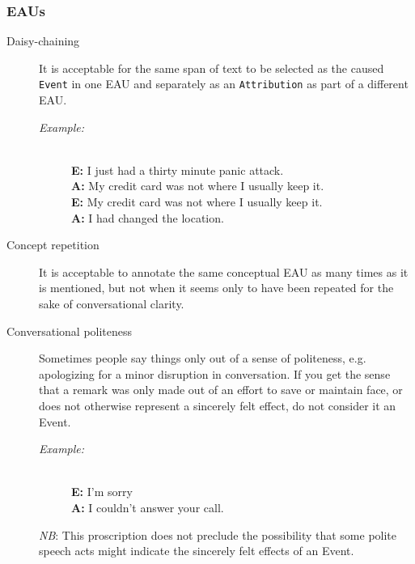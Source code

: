 \documentclass[a4paper,12pt]{article}
\begin{document}
    \subsubsection{EAUs}
    \begin{description}
        \item[Daisy-chaining] It is acceptable for the same span of text to be selected as the caused \texttt{Event} in one EAU and separately as an \texttt{Attribution} as part of a different EAU.
            \begin{description}
                \item[\emph{Example:}]\mbox{}\\
                \textbf{E:} I just had a thirty minute panic attack.\\ 
                \textbf{A:} My credit card was not where I usually keep it.\\
                \textbf{E:} My credit card was not where I usually keep it.\\
                \textbf{A:} I had changed the location.
            \end{description}
    \end{description}
    \begin{description}
        \item[Concept repetition] It is acceptable to annotate the same conceptual EAU as many times as it is mentioned, but not when it seems only to have been repeated for the sake of conversational clarity.
    \end{description}
    \begin{description}
        \item[Conversational politeness] Sometimes people say things only out of a sense of politeness, e.g. apologizing for a minor disruption in conversation. If you get the sense that a remark was only made out of an effort to save or maintain face, or does not otherwise represent a sincerely felt effect, do not consider it an Event.
            \begin{description}
                \item[\emph{Example:}]\mbox{}\\
                \textbf{E:} I'm sorry\\ 
                \textbf{A:} I couldn't answer your call.\\
            \end{description}
            
        \emph{NB}: This proscription does not preclude the possibility that some polite speech acts might indicate the sincerely felt effects of an Event.
    \end{description}
\end{document}
